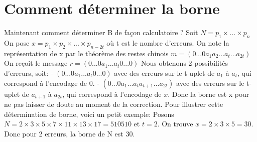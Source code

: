 \documentclass[a4paper, 11pt]{report}
\begin{document}
\newpage

\section{Comment déterminer la borne}


Maintenant comment déterminer B de façon calculatoire ? \newline
Soit $N=p_1\times ...\times p_n$
On pose $x=p_1 \times p_2 \times ... \times p_{n-2t}$ où t est le nombre d'erreurs. \newline
On note la représentation de x par le théorème des restes chinois $m=(0...0 a_1 a_2 ... a_t ... a_{2t})$ \newline
On reçoit le message $r=(0...0 a_1...a_t 0...0)$ \newline
Nous obtenons 2 possibilités d'erreurs, soit: \newline
- $(0...0 a_1...a_t 0...0) $ avec des erreurs sur le t-uplet de $a_1$ à $a_t$, qui correspond à l'encodage de 0. \newline
- $(0...0 a_1...a_t a_{t+1}...a_{2t})$ avec des erreurs sur le t-uplet de $a_{t+1}$ à $a_{2t}$, qui correspond à l'encodage de $x$. \newline
Donc la borne est x pour ne pas laisser de doute au moment de la correction. \newline
\newline
Pour illustrer cette détermination de borne, voici un petit exemple: \newline
Posons $N=2\times 3\times 5\times 7\times 11\times 13 \times 17= 510510$ et $t=2$. \newline
On trouve $x=2\times 3\times 5=30$. Donc pour 2 erreurs, la borne de N est 30.
\end{document}
